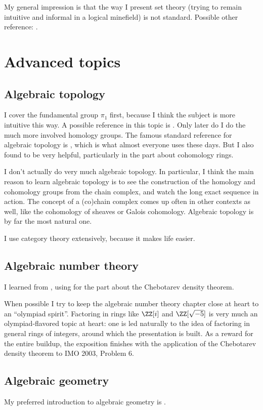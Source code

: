My general impression is that the way I present set theory
(trying to remain intuitive and informal in a logical minefield)
is not standard. Possible other reference: \cite{ref:miquel}.

\section{Advanced topics}
\subsection{Algebraic topology}
I cover the fundamental group $\pi_1$ first, because I think the subject is more
intuitive this way. A possible reference in this topic is \cite{ref:munkres}.
Only later do I do the much more involved homology groups.
The famous standard reference for algebraic topology is \cite{ref:hatcher},
which is what almost everyone uses these days.
But I also found \cite{ref:maxim752} to be very helpful,
particularly in the part about cohomology rings.

I don't actually do very much algebraic topology.
In particular, I think the main reason to learn algebraic topology
is to see the construction of the homology and cohomology groups
from the chain complex, and watch the long exact sequence in action.
The concept of a (co)chain complex comes up often in other contexts as well,
like the cohomology of sheaves or Galois cohomology.
Algebraic topology is by far the most natural one.

I use category theory extensively, because it makes life easier.

\subsection{Algebraic number theory}
I learned from \cite{ref:oggier_NT}, using \cite{ref:lenstra_chebotarev}
for the part about the Chebotarev density theorem.

When possible I try to keep the algebraic number theory chapter close at
heart to an ``olympiad spirit''.
Factoring in rings like $\ZZ[i]$ and $\ZZ[\sqrt{-5}]$
is very much an olympiad-flavored topic at heart:
one is led naturally to the idea of factoring in general rings of integers,
around which the presentation is built.
As a reward for the entire buildup, the exposition finishes
with the application of the Chebotarev density theorem to IMO 2003, Problem 6.

\subsection{Algebraic geometry}
My preferred introduction to algebraic geometry is \cite{ref:gathmann}.

